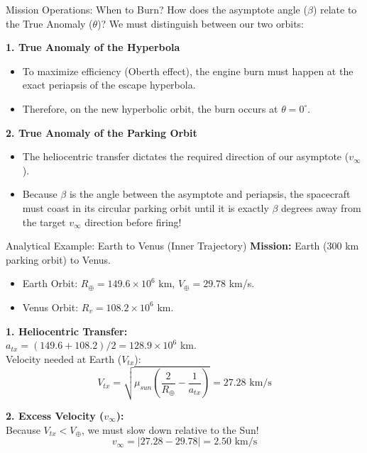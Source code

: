 \documentclass[11pt]{beamer}
\begin{document}
\begin{frame}{Mission Operations: When to Burn?}
    How does the asymptote angle ($\beta$) relate to the True Anomaly ($\theta$)? We must distinguish between our two orbits:
    
    \vspace{0.3cm}
    \textbf{1. True Anomaly of the Hyperbola}
    \begin{itemize}
        \item To maximize efficiency (Oberth effect), the engine burn must happen at the exact periapsis of the escape hyperbola.
        \item Therefore, on the new hyperbolic orbit, the burn occurs at $\theta = 0^\circ$.
    \end{itemize}

    \vspace{0.2cm}
    \textbf{2. True Anomaly of the Parking Orbit}
    \begin{itemize}
        \item The heliocentric transfer dictates the required direction of our asymptote ($v_\infty$).
        \item Because $\beta$ is the angle between the asymptote and periapsis, the spacecraft must coast in its circular parking orbit until it is exactly $\beta$ degrees away from the target $v_\infty$ direction before firing!
    \end{itemize}
\end{frame}

\begin{frame}{Analytical Example: Earth to Venus (Inner Trajectory)}
    \textbf{Mission:} Earth (300 km parking orbit) to Venus.
    \begin{itemize}
        \item Earth Orbit: $R_\oplus = 149.6 \times 10^6$ km, $V_\oplus = 29.78$ km/s.
        \item Venus Orbit: $R_v = 108.2 \times 10^6$ km.
    \end{itemize}
    
    \textbf{1. Heliocentric Transfer:} \\
    $a_{tx} = (149.6 + 108.2)/2 = 128.9 \times 10^6$ km. \\
    Velocity needed at Earth ($V_{tx}$):
    \begin{equation*}
        V_{tx} = \sqrt{\mu_{sun} \left( \frac{2}{R_\oplus} - \frac{1}{a_{tx}} \right)} = 27.28 \text{ km/s}
    \end{equation*}
    
    \textbf{2. Excess Velocity ($v_\infty$):} \\
    Because $V_{tx} < V_\oplus$, we must slow down relative to the Sun!
    \begin{equation*}
        v_\infty = |27.28 - 29.78| = 2.50 \text{ km/s}
    \end{equation*}
\end{frame}
\end{document}
